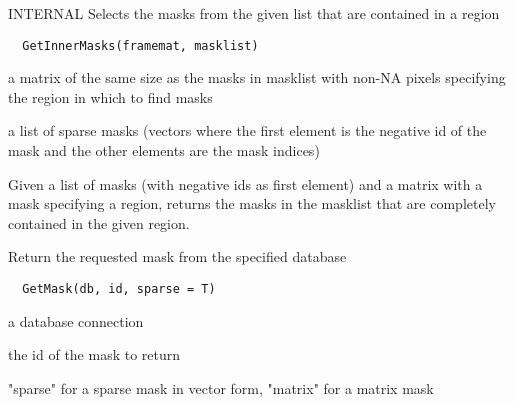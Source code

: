 \documentclass[a4paper]{book}
\begin{document}
%
\begin{Description}\relax
INTERNAL Selects the masks from the given list that are
contained in a region
\end{Description}
%
\begin{Usage}
\begin{verbatim}
  GetInnerMasks(framemat, masklist)
\end{verbatim}
\end{Usage}
%
\begin{Arguments}
\begin{ldescription}
\item[\code{framemat}] a matrix of the same size as the masks in
masklist with non-NA pixels specifying the region in
which to find masks

\item[\code{masklist}] a list of sparse masks (vectors where the
first element is the negative id of the mask and the
other elements are the mask indices)
\end{ldescription}
\end{Arguments}
%
\begin{Details}\relax
Given a list of masks (with negative ids as first
element) and a matrix with a mask specifying a region,
returns the masks in the masklist that are completely
contained in the given region.
\end{Details}
%
\begin{Description}\relax
Return the requested mask from the specified database
\end{Description}
%
\begin{Usage}
\begin{verbatim}
  GetMask(db, id, sparse = T)
\end{verbatim}
\end{Usage}
%
\begin{Arguments}
\begin{ldescription}
\item[\code{db}] a database connection

\item[\code{id}] the id of the mask to return

\item[\code{format}] "sparse" for a sparse mask in vector form,
"matrix" for a matrix mask
\end{ldescription}
\end{Arguments}
\end{document}

